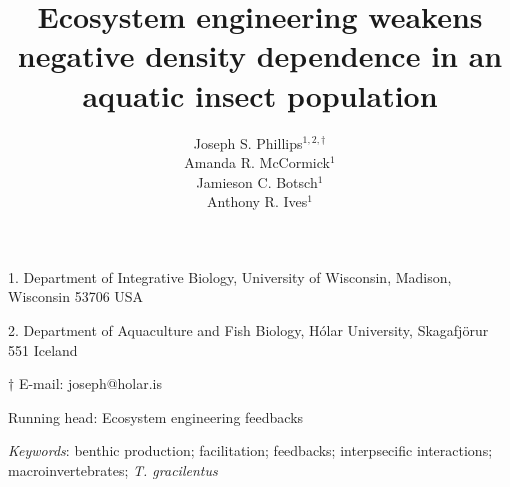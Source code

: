 \documentclass[12pt]{article}
\title{Ecosystem engineering weakens negative density dependence in an aquatic insect population}
\author{
Joseph S. Phillips$^{1,2,\dagger}$ \\
Amanda R. McCormick$^{1}$ \\
Jamieson C. Botsch$^{1}$ \\
Anthony R. Ives$^{1}$}
\date{}
\begin{document}
\raggedright
\setlength\parindent{0.25in}

\maketitle

\noindent{} 1. Department of Integrative Biology, University of Wisconsin, Madison, Wisconsin 53706 USA

\noindent{} 2. Department of Aquaculture and Fish Biology, H\'{o}lar University, Skagafj\"{o}r{\dh}ur 551 Iceland

\noindent{} $\dagger$ E-mail: joseph@holar.is

\bigskip

Running head: {Ecosystem engineering feedbacks}

\linenumbers{}

\clearpage








\bigskip

\textit{Keywords}: {benthic production; 
                    facilitation; 
                    feedbacks; 
                    interpsecific interactions; 
                    macroinvertebrates;
                    \emph{T. gracilentus}}

\clearpage











\end{document}

